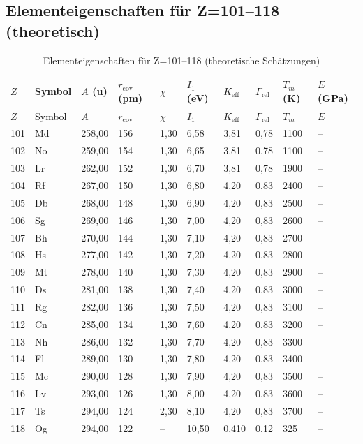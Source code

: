 \documentclass[12pt,a4paper]{article}
\newcommand{\Keff}{K_{\mathrm{eff}}}
\begin{document}
	\subsection*{Elementeigenschaften für Z=101–118 (theoretisch)}
	
	\begin{longtable}{p{0.6cm}p{1.2cm}p{1.2cm}p{1.2cm}p{1.2cm}p{1.2cm}p{1.5cm}p{1.2cm}p{1.2cm}p{1.2cm}}
		\caption{Elementeigenschaften für Z=101–118 (theoretische Schätzungen)} \label{tab:elem-data-101to118} \\
		\toprule
		\(Z\) & Symbol & \(A\) (u) & \(r_{\text{cov}}\) (pm) & \(\chi\) & \(I_1\) (eV) & \(\Keff\) & \(\Gamma_{\text{rel}}\) & \(T_m\) (K) & \(E\) (GPa) \\
		\midrule
		\endfirsthead
		\toprule
		\(Z\) & Symbol & \(A\) & \(r_{\text{cov}}\) & \(\chi\) & \(I_1\) & \(\Keff\) & \(\Gamma_{\text{rel}}\) & \(T_m\) & \(E\) \\
		\midrule
		\endhead
		101 & Md & 258,00 & 156 & 1,30 & 6,58 & 3,81 & 0,78 & 1100 & – \\
		102 & No & 259,00 & 154 & 1,30 & 6,65 & 3,81 & 0,78 & 1100 & – \\
		103 & Lr & 262,00 & 152 & 1,30 & 6,70 & 3,81 & 0,78 & 1900 & – \\
		104 & Rf & 267,00 & 150 & 1,30 & 6,80 & 4,20 & 0,83 & 2400 & – \\
		105 & Db & 268,00 & 148 & 1,30 & 6,90 & 4,20 & 0,83 & 2500 & – \\
		106 & Sg & 269,00 & 146 & 1,30 & 7,00 & 4,20 & 0,83 & 2600 & – \\
		107 & Bh & 270,00 & 144 & 1,30 & 7,10 & 4,20 & 0,83 & 2700 & – \\
		108 & Hs & 277,00 & 142 & 1,30 & 7,20 & 4,20 & 0,83 & 2800 & – \\
		109 & Mt & 278,00 & 140 & 1,30 & 7,30 & 4,20 & 0,83 & 2900 & – \\
		110 & Ds & 281,00 & 138 & 1,30 & 7,40 & 4,20 & 0,83 & 3000 & – \\
		111 & Rg & 282,00 & 136 & 1,30 & 7,50 & 4,20 & 0,83 & 3100 & – \\
		112 & Cn & 285,00 & 134 & 1,30 & 7,60 & 4,20 & 0,83 & 3200 & – \\
		113 & Nh & 286,00 & 132 & 1,30 & 7,70 & 4,20 & 0,83 & 3300 & – \\
		114 & Fl & 289,00 & 130 & 1,30 & 7,80 & 4,20 & 0,83 & 3400 & – \\
		115 & Mc & 290,00 & 128 & 1,30 & 7,90 & 4,20 & 0,83 & 3500 & – \\
		116 & Lv & 293,00 & 126 & 1,30 & 8,00 & 4,20 & 0,83 & 3600 & – \\
		117 & Ts & 294,00 & 124 & 2,30 & 8,10 & 4,20 & 0,83 & 3700 & – \\
		118 & Og & 294,00 & 122 & –    & 10,50 & 0,410 & 0,12 & 325 & – \\
		\bottomrule
	\end{longtable}
\end{document}
